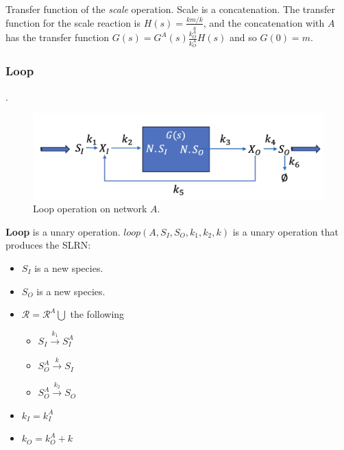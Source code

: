 \documentclass[unnumsec,webpdf,contemporary,large]{oup-authoring-template}%
\theoremstyle{thmstyleone}%
\theoremstyle{thmstyletwo}%
\theoremstyle{thmstylethree}%
\begin{document}
Transfer function of the {\em scale} operation.
Scale is a concatenation.
The transfer function for the scale reaction is
$H(s) = \frac{km/k } {s}$, and the concatenation with $A$
has the transfer function
$G(s) = G^A(s) \frac{k^A_O}{k^A_O} H(s)$ and so
$G(0) = m$.


\subsubsection{Loop}
\color{red}{Eliminate $X_0$}\color{black}.

\begin{figure}
         \centering
         \includegraphics[scale=0.4]{figures/loop.png}
          \caption[]{Loop operation on network $A$.}
         \label{fig:concatenate}
\end{figure}
{\bf Loop} is a unary operation.
$loop(A, S_I, S_O, k_1, k_2, k)$ is a unary operation that produces
the SLRN:
\begin{itemize}
\item $S_I$ is a new species.
\item $S_O$ is a new species.
\item $\mathcal{R} = \mathcal{R}^A \bigcup$ the following
\begin{itemize}
\item $S_I \xrightarrow{k_1} S^A_I$
\item $S^A_O \xrightarrow{k} S_I$
\item $S^A_O \xrightarrow{k_2} S_O$
\end{itemize}
\item $k_I = k^A_I$
\item $k_O = k^A_O + k$
\end{itemize}
\end{document}
